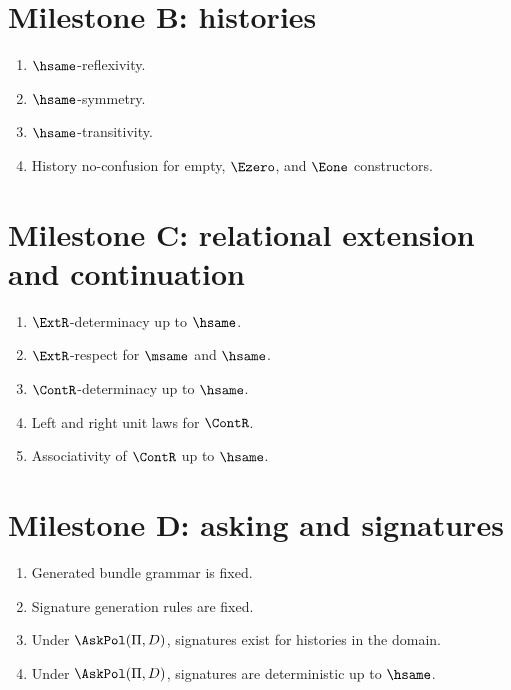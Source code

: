 \section{Milestone B: histories}

\begin{enumerate}
  \item \(\hsame\)-reflexivity.
  \item \(\hsame\)-symmetry.
  \item \(\hsame\)-transitivity.
  \item History no-confusion for empty, \(\Ezero\), and \(\Eone\) constructors.
\end{enumerate}

\section{Milestone C: relational extension and continuation}

\begin{enumerate}
  \item \(\ExtR\)-determinacy up to \(\hsame\).
  \label{thm:proof-sprint-extension-determinacy}
  \item \(\ExtR\)-respect for \(\msame\) and \(\hsame\).
  \item \(\ContR\)-determinacy up to \(\hsame\).
  \item Left and right unit laws for \(\ContR\).
  \label{thm:proof-sprint-continuation-right-unit}
  \item Associativity of \(\ContR\) up to \(\hsame\).
\end{enumerate}

\section{Milestone D: asking and signatures}

\begin{enumerate}
  \item Generated bundle grammar is fixed.
  \item Signature generation rules are fixed.
  \item Under \(\AskPol(\Pi,D)\), signatures exist for histories in the domain.
  \item Under \(\AskPol(\Pi,D)\), signatures are deterministic up to \(\hsame\).
\end{enumerate}

